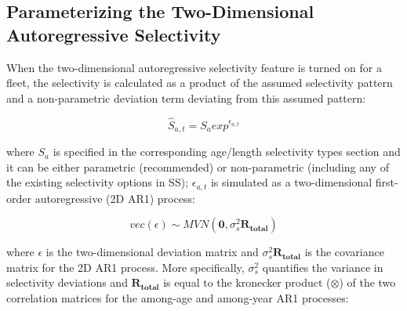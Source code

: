 
\hypertarget{2DAR}{}
\subsection{Parameterizing the Two-Dimensional Autoregressive Selectivity}
When the two-dimensional autoregressive selectivity feature is turned on for a fleet, the selectivity is calculated as a product of the assumed selectivity pattern and a non-parametric deviation term deviating from this assumed pattern:

\begin{equation}
\hat{S}_{a,t} = S_aexp^{\epsilon_{a,t}}
\end{equation}

where $S_a$ is specified in the corresponding age/length selectivity types section and it can be either parametric (recommended) or non-parametric (including any of the existing selectivity options in SS); $\epsilon_{a,t}$ is simulated as a two-dimensional first-order autoregressive (2D AR1) process:

\begin{equation}
vec(\epsilon) \sim MVN(\mathbf{0},\sigma_s^2\mathbf{R_{total}})
\end{equation}

where $\epsilon$ is the two-dimensional deviation matrix and $\sigma_s^2\mathbf{R_{total}}$ is the covariance matrix for the 2D AR1 process. More specifically, $\sigma_s^2$ quantifies the variance in selectivity deviations and $\mathbf{R_{total}}$ is equal to the kronecker product ($\otimes$) of the two correlation matrices for the among-age and among-year AR1 processes:

